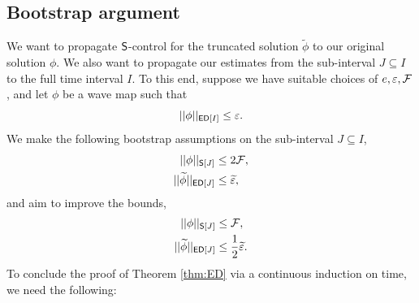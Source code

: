 \subsection{Bootstrap argument}


We want to propagate $\mathsf S$-control for the truncated solution $\widetilde\phi$ to our original solution $\phi$. We also want to propagate our estimates from the sub-interval $J \subseteq I$ to the full time interval $I$. To this end, suppose we have suitable choices of $e, \varepsilon, \mathcal F$, and let $\phi$ be a wave map such that 
	\begin{equation}
		||\phi||_{\mathsf{ED} [I]} \leq \varepsilon.
		\label{eq:ED1}
	\end{equation}
We make the following bootstrap assumptions on the sub-interval $J \subseteq I$,
	\begin{align}
		||\phi||_{\mathsf S [J]}
			&\leq 2 \mathcal F , \label{eq:BS1}\\
		||\widetilde \phi||_{\mathsf{ED} [J]}
			&\leq \widetilde {\varepsilon} \label{eq:BS2},
	\end{align}
and aim to improve the bounds, 
	\begin{align}
		||\phi||_{\mathsf S [J]}
			&\leq \mathcal F, \label{eq:BS1i} \\
		||\widetilde \phi||_{\mathsf{ED} [J]}
			&\leq \frac12\widetilde{\varepsilon} \label{eq:BS2i}. 		
	\end{align}
To conclude the proof of Theorem \ref{thm:ED} via a continuous induction on time, we need the following:


